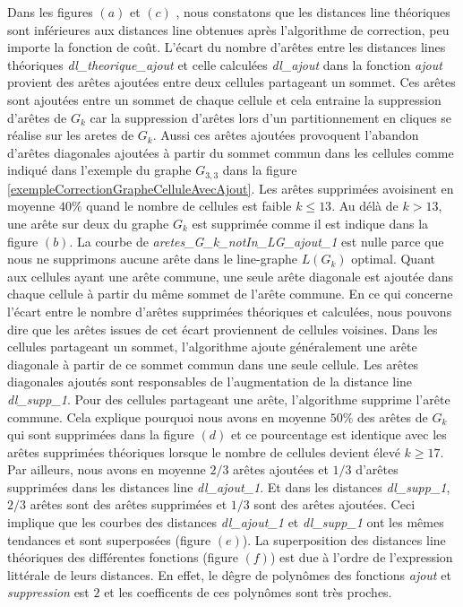 Dans les figures $(a)$ et $(c)$ , nous constatons que les distances line th\'eoriques sont inf\'erieures aux distances line obtenues apr\`es l'algorithme de correction, peu importe la fonction de co\^ut.
L'\'ecart du nombre d'ar\^etes entre les distances lines th\'eoriques {\em dl\_theorique\_ajout} et celle calcul\'ees {\em dl\_ajout} dans la fonction {\em ajout} provient des ar\^etes ajout\'ees entre deux cellules partageant un sommet. Ces ar\^etes sont ajout\'ees entre un sommet de chaque cellule et cela entraine la suppression d'ar\^etes de $G_k$  car la suppression d'ar\^etes lors d'un partitionnement en cliques se r\'ealise sur les aretes de $G_k$. Aussi ces ar\^etes ajout\'ees provoquent l'abandon d'ar\^etes diagonales ajout\'ees \`a partir du sommet commun dans les cellules comme indiqu\'e dans l'exemple du graphe $G_{3,3}$ dans la figure \ref{exempleCorrectionGrapheCelluleAvecAjout}. 
Les ar\^etes supprim\'ees avoisinent en moyenne $40\%$ quand le nombre de cellules est faible $k\le13$. Au d\'el\`a de $k > 13$, une ar\^ete sur deux du graphe $G_{k}$ est supprim\'ee comme il est indique dans la figure $(b)$.
La courbe de {\em aretes\_G\_k\_notIn\_LG\_ajout\_1} est nulle parce que nous ne supprimons aucune ar\^ete dans le line-graphe $L(G_k)$ optimal.
Quant aux cellules ayant une ar\^ete commune, une seule ar\^ete diagonale est ajout\'ee dans chaque cellule \`a partir du m\^eme sommet de l'ar\^ete commune.  
\newline  
En ce qui concerne  l'\'ecart entre le nombre d'ar\^etes supprim\'ees th\'eoriques et calcul\'ees, nous pouvons dire que les ar\^etes issues de cet \'ecart proviennent de cellules voisines. Dans les cellules partageant un sommet, l'algorithme ajoute g\'en\'eralement une ar\^ete diagonale \`a partir de ce sommet commun dans une seule cellule. Les ar\^etes diagonales ajout\'es sont responsables de l'augmentation de la distance line {\em dl\_supp\_1}.
Pour des cellules partageant une ar\^ete, l'algorithme supprime l'ar\^ete commune.  Cela explique pourquoi nous avons en moyenne $50\%$ des ar\^etes de $G_k$ qui sont supprim\'ees dans la figure $(d)$ et ce pourcentage est identique avec les ar\^etes supprim\'ees th\'eoriques lorsque le nombre de cellules devient \'elev\'e $k \ge 17$.
\newline
Par ailleurs, 
nous avons en moyenne $2/3$ ar\^etes ajout\'ees et $1/3$ d'ar\^etes supprim\'ees dans les distances line {\em dl\_ajout\_1}. Et dans les distances {\em dl\_supp\_1}, $2/3$ ar\^etes sont des ar\^etes supprim\'ees et $1/3$ sont des ar\^etes ajout\'ees.
Ceci implique que les courbes des distances   {\em dl\_ajout\_1} et {\em dl\_supp\_1} ont les m\^emes tendances et sont superpos\'ees (figure $(e)$). 
La superposition des distances line th\'eoriques des diff\'erentes fonctions (figure $(f)$) est due \`a l'ordre de l'expression litt\'erale de leurs distances. En effet, le d\^egre de polyn\^omes des fonctions {\em ajout} et {\em suppression} est $2$ et les coefficents de ces polyn\^omes sont tr\`es proches.
\newline

